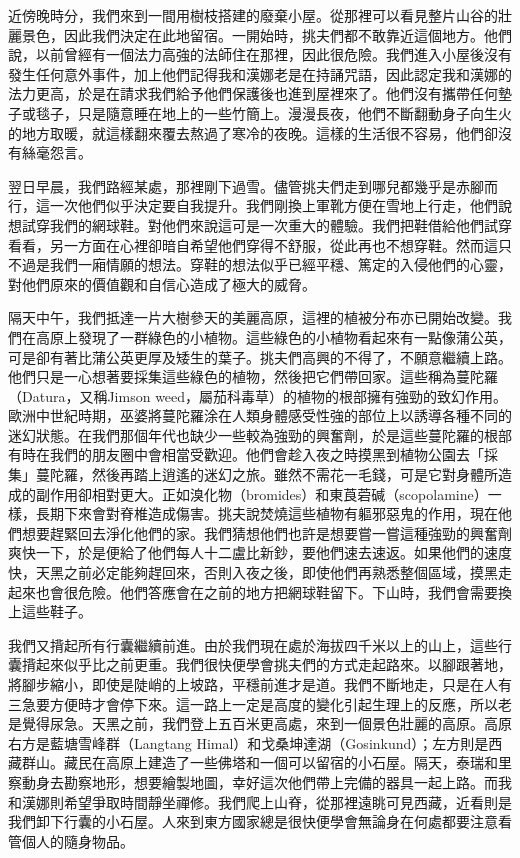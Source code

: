 近傍晚時分，我們來到一間用樹枝搭建的廢棄小屋。從那裡可以看見整片山谷的壯麗景色，因此我們決定在此地留宿。一開始時，挑夫們都不敢靠近這個地方。他們說，以前曾經有一個法力高強的法師住在那裡，因此很危險。我們進入小屋後沒有發生任何意外事件，加上他們記得我和漢娜老是在持誦咒語，因此認定我和漢娜的法力更高，於是在請求我們給予他們保護後也進到屋裡來了。他們沒有攜帶任何墊子或毯子，只是隨意睡在地上的一些竹簡上。漫漫長夜，他們不斷翻動身子向生火的地方取暖，就這樣翻來覆去熬過了寒冷的夜晚。這樣的生活很不容易，他們卻沒有絲毫怨言。

翌日早晨，我們路經某處，那裡剛下過雪。儘管挑夫們走到哪兒都幾乎是赤腳而行，這一次他們似乎決定要自我提升。我們剛換上軍靴方便在雪地上行走，他們說想試穿我們的網球鞋。對他們來說這可是一次重大的體驗。我們把鞋借給他們試穿看看，另一方面在心裡卻暗自希望他們穿得不舒服，從此再也不想穿鞋。然而這只不過是我們一廂情願的想法。穿鞋的想法似乎已經平穩、篤定的入侵他們的心靈，對他們原來的價值觀和自信心造成了極大的威脅。

隔天中午，我們抵達一片大樹參天的美麗高原，這裡的植被分布亦已開始改變。我們在高原上發現了一群綠色的小植物。這些綠色的小植物看起來有一點像蒲公英，可是卻有著比蒲公英更厚及矮生的葉子。挑夫們高興的不得了，不願意繼續上路。他們只是一心想著要採集這些綠色的植物，然後把它們帶回家。這些稱為蔓陀羅（Datura，又稱Jimson
weed，屬茄科毒草）的植物的根部擁有強勁的致幻作用。歐洲中世紀時期，巫婆將蔓陀羅涂在人類身體感受性強的部位上以誘導各種不同的迷幻狀態。在我們那個年代也缺少一些較為強勁的興奮劑，於是這些蔓陀羅的根部有時在我們的朋友圈中會相當受歡迎。他們會趁入夜之時摸黑到植物公園去「採集」蔓陀羅，然後再踏上逍遙的迷幻之旅。雖然不需花一毛錢，可是它對身體所造成的副作用卻相對更大。正如溴化物（bromides）和東莨菪碱（scopolamine）一樣，長期下來會對脊椎造成傷害。挑夫說焚燒這些植物有軀邪惡鬼的作用，現在他們想要趕緊回去淨化他們的家。我們猜想他們也許是想要嘗一嘗這種強勁的興奮劑爽快一下，於是便給了他們每人十二盧比新鈔，要他們速去速返。如果他們的速度快，天黑之前必定能夠趕回來，否則入夜之後，即使他們再熟悉整個區域，摸黑走起來也會很危險。他們答應會在之前的地方把網球鞋留下。下山時，我們會需要換上這些鞋子。

我們又揹起所有行囊繼續前進。由於我們現在處於海拔四千米以上的山上，這些行囊揹起來似乎比之前更重。我們很快便學會挑夫們的方式走起路來。以腳跟著地，將腳步縮小，即使是陡峭的上坡路，平穩前進才是道。我們不斷地走，只是在人有三急要方便時才會停下來。這一路上一定是高度的變化引起生理上的反應，所以老是覺得尿急。天黑之前，我們登上五百米更高處，來到一個景色壯麗的高原。高原右方是藍塘雪峰群（Langtang
Himal）和戈桑坤達湖（Gosinkund）；左方則是西藏群山。藏民在高原上建造了一些佛塔和一個可以留宿的小石屋。隔天，泰瑞和里察動身去勘察地形，想要繪製地圖，幸好這次他們帶上完備的器具一起上路。而我和漢娜則希望爭取時間靜坐禪修。我們爬上山脊，從那裡遠眺可見西藏，近看則是我們卸下行囊的小石屋。人來到東方國家總是很快便學會無論身在何處都要注意看管個人的隨身物品。


